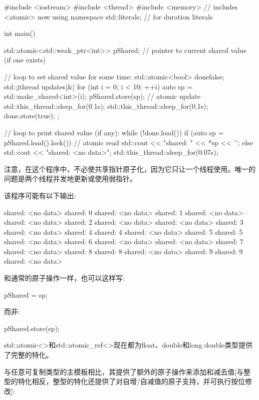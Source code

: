 \begin{cpp}
#include <iostream>
#include <thread>
#include <memory> // includes <atomic> now
using namespace std::literals; // for duration literals

int main()
{
	std::atomic<std::weak_ptr<int>> pShared; // pointer to current shared value (if one exists)
	
	// loop to set shared value for some time:
	std::atomic<bool> done{false};
	std::jthread updates{[&] {
							for (int i = 0; i < 10; ++i) {
								{
									auto sp = std::make_shared<int>(i);
									pShared.store(sp); // atomic update
									std::this_thread::sleep_for(0.1s);
								}
								std::this_thread::sleep_for(0.1s);
							}
							done.store(true);
					}};
				
	// loop to print shared value (if any):
	while (!done.load()) {
		if (auto sp = pShared.load().lock()) { // atomic read
			std::cout << "shared: " << *sp << '\n';
		}
		else {
			std::cout << "shared: <no data>\n";
		}
		std::this_thread::sleep_for(0.07s);
	}
}
\end{cpp}

注意，在这个程序中，不必使共享指针原子化，因为它只让一个线程使用。唯一的问题是两个线程并发地更新或使用弱指针。

该程序可能有以下输出:

\begin{shell}
shared: <no data>
shared: 0
shared: <no data>
shared: 1
shared: <no data>
shared: <no data>
shared: 2
shared: <no data>
shared: <no data>
shared: 3
shared: <no data>
shared: 4
shared: 4
shared: <no data>
shared: 5
shared: 5
shared: <no data>
shared: 6
shared: <no data>
shared: <no data>
shared: 7
shared: <no data>
shared: 8
shared: 8
shared: <no data>
shared: 9
shared: 9
shared: <no data>
\end{shell}

和通常的原子操作一样，也可以这样写:

\begin{cpp}
pShared = sp;
\end{cpp}

而非:

\begin{cpp}
pShared.store(sp);
\end{cpp}


std::atomic<>和std::atomic\_ref<>现在都为float、double和long double类型提供了完整的特化。

与任意可复制类型的主模板相比，其提供了额外的原子操作来添加和减去值[与整型的特化相反，整型的特化还提供了对自增/自减值的原子支持，并可执行按位修改]:

